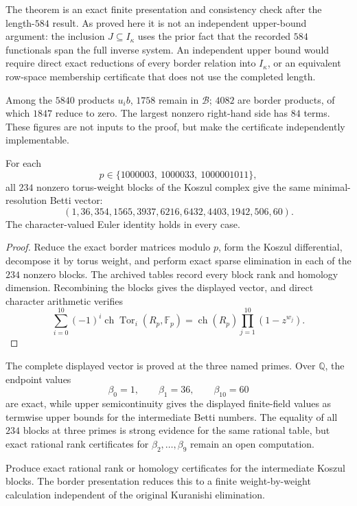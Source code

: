 \begin{remark}
The theorem is an exact finite presentation and consistency check after the
length-\(584\) result.  As proved here it is not an independent upper-bound
argument: the inclusion \(J\subseteq I_\kappa\) uses the prior fact that the
recorded \(584\) functionals span the full inverse system.  An independent
upper bound would require direct exact reductions of every border relation
into \(I_\kappa\), or an equivalent row-space membership certificate that
does not use the completed length.
\end{remark}

Among the \(5840\) products \(u_i b\), \(1758\) remain in \(\mathcal B\);
\(4082\) are border products, of which \(1847\) reduce to zero.  The largest
nonzero right-hand side has \(84\) terms.  These figures are not inputs to
the proof, but make the certificate independently implementable.

\begin{theorem}
\label{thm:three-prime-betti}
For each
\[
p\in\{1000003,\ 1000033,\ 1000001011\},
\]
all \(234\) nonzero torus-weight blocks of the Koszul complex give the same
minimal-resolution Betti vector:
\[
\boxed{
(1,36,354,1565,3937,6216,6432,4403,1942,506,60).
}
\]
The character-valued Euler identity holds in every case.
\end{theorem}

\begin{proof}
Reduce the exact border matrices modulo \(p\), form the Koszul differential,
decompose it by torus weight, and perform exact sparse elimination in each
of the \(234\) nonzero blocks.  The archived tables record every block rank
and homology dimension.  Recombining the blocks gives the displayed vector,
and direct character arithmetic verifies
\[
\sum_{i=0}^{10}(-1)^i\operatorname{ch}
\operatorname{Tor}_i(R_p,\mathbb F_p)
=\operatorname{ch}(R_p)\prod_{j=1}^{10}(1-z^{w_j}).
\]
\end{proof}

\begin{remark}
\label{rem:rational-betti-boundary}
The complete displayed vector is proved at the three named primes.  Over
\(\mathbb Q\), the endpoint values
\[
\beta_0=1,\qquad\beta_1=36,\qquad\beta_{10}=60
\]
are exact, while upper semicontinuity gives the displayed finite-field
values as termwise upper bounds for the intermediate Betti numbers.  The
equality of all \(234\) blocks at three primes is strong evidence for the
same rational table, but exact rational rank certificates for
\(\beta_2,\ldots,\beta_9\) remain an open computation.
\end{remark}

\begin{question}
\label{q:rational-betti}
Produce exact rational rank or homology certificates for the intermediate
Koszul blocks.  The border presentation reduces this to a finite
weight-by-weight calculation independent of the original Kuranishi
elimination.
\end{question}
